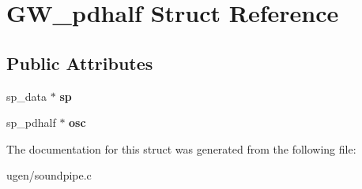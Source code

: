 \hypertarget{structGW__pdhalf}{}\section{G\+W\+\_\+pdhalf Struct Reference}
\label{structGW__pdhalf}
\subsection*{Public Attributes}
\begin{DoxyCompactItemize}
\item 
\hypertarget{structGW__pdhalf_a639126e860b9aaac5edab705ba2e97c6}{}\label{structGW__pdhalf_a639126e860b9aaac5edab705ba2e97c6} 
sp\+\_\+data $\ast$ {\bfseries sp}
\item 
\hypertarget{structGW__pdhalf_af9cc16f7e86b3f97fa16cf7f8c9bea61}{}\label{structGW__pdhalf_af9cc16f7e86b3f97fa16cf7f8c9bea61} 
sp\+\_\+pdhalf $\ast$ {\bfseries osc}
\end{DoxyCompactItemize}


The documentation for this struct was generated from the following file\+:\begin{DoxyCompactItemize}
\item 
ugen/soundpipe.\+c\end{DoxyCompactItemize}
